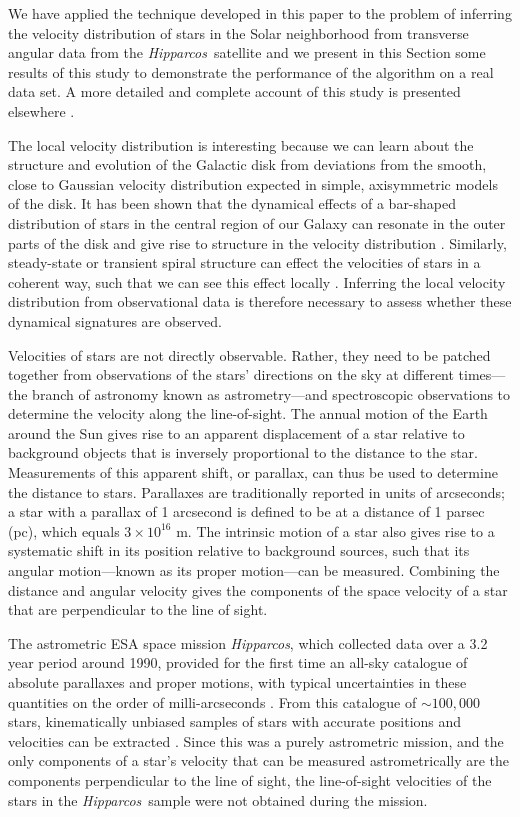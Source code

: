 \documentclass[aoas,preprint,authoryear,round]{imsart}
\newcommand{\eg}{e.g.}
\newcommand{\Hipparcos}{\emph{Hipparcos}}
\begin{document}
We have applied the technique developed in this paper to the problem
of inferring the velocity distribution of stars in the Solar
neighborhood from transverse angular data from the \Hipparcos\
satellite and we present in this Section some results of this study to
demonstrate the performance of the algorithm on a real data set. A
more detailed and complete account of this study is presented
elsewhere \citep{Bovy09b}.

The local velocity distribution is interesting because we can learn
about the structure and evolution of the Galactic disk from deviations
from the smooth, close to Gaussian velocity distribution expected in
simple, axisymmetric models of the disk. It has been shown that the
dynamical effects of a bar-shaped distribution of stars in the central
region of our Galaxy can resonate in the outer parts of the disk and
give rise to structure in the velocity distribution
\citep[\eg,][]{Dehnen00a,Bovy10b}. Similarly, steady-state or
transient spiral structure can effect the velocities of stars in a
coherent way, such that we can see this effect locally
\citep[\eg,][]{2005AJ....130..576Q,2004MNRAS.350..627D}. Inferring the
local velocity distribution from observational data is therefore
necessary to assess whether these dynamical signatures are observed.

Velocities of stars are not directly observable. Rather, they need to
be patched together from observations of the stars' directions on the
sky at different times---the branch of astronomy known as
astrometry---and spectroscopic observations to determine the velocity
along the line-of-sight. The annual motion of the Earth around the Sun
gives rise to an apparent displacement of a star relative to
background objects that is inversely proportional to the distance to
the star. Measurements of this apparent shift, or parallax, can thus
be used to determine the distance to stars. Parallaxes are
traditionally reported in units of arcseconds; a star with a parallax
of 1 arcsecond is defined to be at a distance of 1 parsec (pc), which
equals $3\times 10^{16}$ m. The intrinsic motion of a star also gives
rise to a systematic shift in its position relative to background
sources, such that its angular motion---known as its proper
motion---can be measured. Combining the distance and angular velocity
gives the components of the space velocity of a star that are
perpendicular to the line of sight.

The astrometric ESA space mission \Hipparcos, which collected data
over a 3.2 year period around 1990, provided for the first time an
all-sky catalogue of absolute parallaxes and proper motions, with
typical uncertainties in these quantities on the order of
milli-arcseconds \citep{ESA97a}. From this catalogue of
$\sim\!100,000$ stars, kinematically unbiased samples of stars with
accurate positions and velocities can be extracted
\citep{1998MNRAS.298..387D}. Since this was a purely astrometric
mission, and the only components of a star's velocity that can be
measured astrometrically are the components perpendicular to the line
of sight, the line-of-sight velocities of the stars in the \Hipparcos\
sample were not obtained during the mission.
\end{document}
